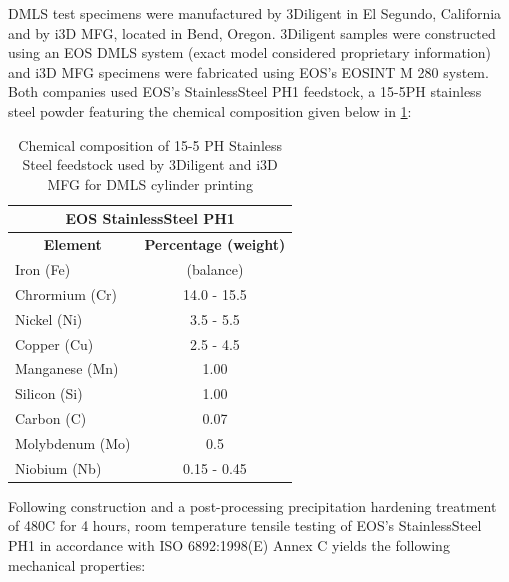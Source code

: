 \gls{DMLS} test specimens were manufactured by 3Diligent in El Segundo, California and by i3D MFG, located in Bend, Oregon.
3Diligent samples were constructed using an EOS \gls{DMLS} system (exact model considered proprietary information) and i3D MFG specimens were fabricated using EOS's EOSINT M 280 system. Both companies used EOS's StainlessSteel PH1 feedstock, a 15-5PH stainless steel powder featuring the chemical composition given below in \cref{tab:3Diligent_Chem_Comp}:

\FloatBarrier
\begin{table}[h]
  \centering
  \caption{Chemical composition of 15-5 PH Stainless Steel feedstock used by 3Diligent and i3D MFG for \gls{DMLS} cylinder printing  \cite{EOS_StainlessSteel_M290}}
    \begin{tabular}{lc}
    \multicolumn{2}{c}{\textbf{\large EOS StainlessSteel PH1}} \\
    \midrule
    \multicolumn{1}{c}{\textbf{Element}} & \textbf{Percentage (weight)} \\
    \midrule
    Iron (Fe) & (balance) \\
    Chrormium (Cr) & 14.0 - 15.5 \\
    Nickel (Ni) & 3.5 - 5.5  \\
    Copper (Cu) & 2.5 - 4.5 \\
    Manganese (Mn) & 1.00 \\
    Silicon (Si) & 1.00 \\
    Carbon (C) & 0.07 \\
    Molybdenum (Mo) & 0.5 \\
    Niobium (Nb) & 0.15 - 0.45 \\
    \bottomrule
    \end{tabular}%
    \label{tab:3Diligent_Chem_Comp}%
\end{table}
\FloatBarrier
Following construction and a post-processing precipitation hardening treatment of 480\degree C for 4 hours, room temperature tensile testing of EOS's StainlessSteel PH1 in accordance with ISO 6892:1998(E) Annex C yields the following mechanical properties:

